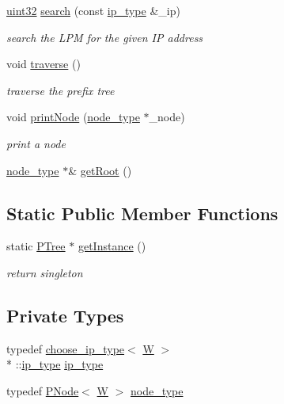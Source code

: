 \begin{DoxyCompactItemize}
\hyperlink{types_8h_abd01e8e67e3d94cab04ecaaf4f85ac1b}{uint32} \hyperlink{classPTree_aca1d149ec5bc7e5c70671084245970e0}{search} (const \hyperlink{classPTree_a946047316df947ae9fbb8a9372c51e77}{ip\-\_\-type} \&\-\_\-ip)
\begin{DoxyCompactList}\small\item\em search the L\-P\-M for the given I\-P address \end{DoxyCompactList}\item 
void \hyperlink{classPTree_aaf5933000ca153c8b57bbd92af1a5602}{traverse} ()
\begin{DoxyCompactList}\small\item\em traverse the prefix tree \end{DoxyCompactList}\item 
void \hyperlink{classPTree_ac25b6287131f184d2c6bafe28c0aadc1}{print\-Node} (\hyperlink{classPTree_ad1004ef68aec722b83a6055ad8e9db55}{node\-\_\-type} $\ast$\-\_\-node)
\begin{DoxyCompactList}\small\item\em print a node \end{DoxyCompactList}\item 
\hyperlink{classPTree_ad1004ef68aec722b83a6055ad8e9db55}{node\-\_\-type} $\ast$\& \hyperlink{classPTree_adfb67964d24883d336e3879b921626b7}{get\-Root} ()
\end{DoxyCompactItemize}
\subsection*{Static Public Member Functions}
\begin{DoxyCompactItemize}
\item 
static \hyperlink{classPTree}{P\-Tree} $\ast$ \hyperlink{classPTree_a35953e10fd9d7e7d903f56bc07cdeede}{get\-Instance} ()
\begin{DoxyCompactList}\small\item\em return singleton \end{DoxyCompactList}\end{DoxyCompactItemize}
\subsection*{Private Types}
\begin{DoxyCompactItemize}
\item 
typedef \hyperlink{types_8h_structchoose__ip__type}{choose\-\_\-ip\-\_\-type}$<$ \hyperlink{test__u128_8cpp_ab21b528bc38899d04d3a7053e52fb797}{W} $>$\\*
\-::\hyperlink{classPTree_a946047316df947ae9fbb8a9372c51e77}{ip\-\_\-type} \hyperlink{classPTree_a946047316df947ae9fbb8a9372c51e77}{ip\-\_\-type}
\item 
typedef \hyperlink{structPNode}{P\-Node}$<$ \hyperlink{test__u128_8cpp_ab21b528bc38899d04d3a7053e52fb797}{W} $>$ \hyperlink{classPTree_ad1004ef68aec722b83a6055ad8e9db55}{node\-\_\-type}
\end{DoxyCompactItemize}
